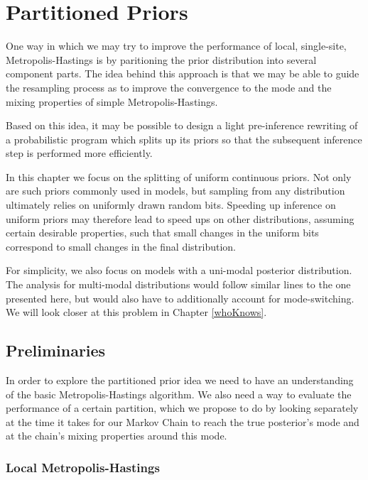 \chapter{Partitioned Priors}

One way in which we may try to improve the performance of local, single-site, Metropolis-Hastings is by paritioning the prior distribution into several component parts. The idea behind this approach is that we may be able to guide the resampling process as to improve the convergence to the mode and the mixing properties of simple Metropolis-Hastings. 

Based on this idea, it may be possible to design a light pre-inference rewriting of a probabilistic program which splits up its priors so that the subsequent inference step is performed more efficiently.

In this chapter we focus on the splitting of uniform continuous priors. Not only are such priors commonly used in models, but sampling from any distribution ultimately relies on uniformly drawn random bits. Speeding up inference on uniform priors may therefore lead to speed ups on other distributions, assuming certain desirable properties, such that small changes in the uniform bits correspond to small changes in the final distribution. 

For simplicity, we also focus on models with a uni-modal posterior distribution. The analysis for multi-modal distributions would follow similar lines to the one presented here, but would also have to additionally account for mode-switching. We will look closer at this problem in Chapter \ref{whoKnows}.

\section{Preliminaries}

In order to explore the partitioned prior idea we need to have an understanding of the basic Metropolis-Hastings algorithm. We also need a way to evaluate the performance of a certain partition, which we propose to do by looking separately at the time it takes for our Markov Chain to reach the true posterior's mode and at the chain's mixing properties around this mode.

\subsection{Local Metropolis-Hastings}

